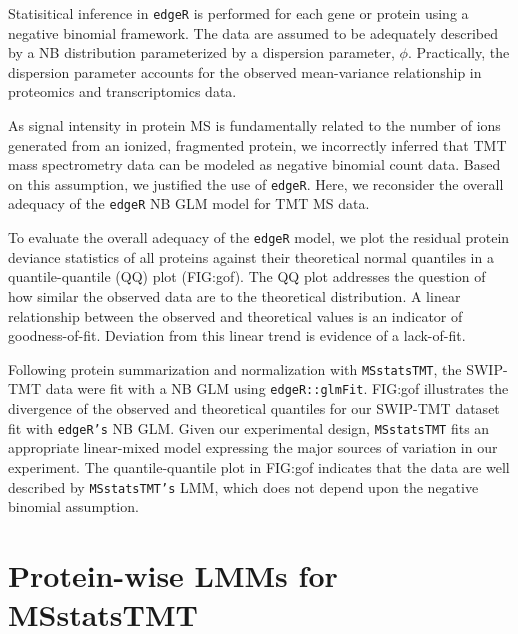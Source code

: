 \documentclass[11pt]{elife}\usepackage[]{graphicx}\usepackage[]{color}
\begin{document}
Statisitical inference in \texttt{edgeR} is performed for each gene or protein 
using a negative binomial framework. The data are assumed to 
be adequately described by a NB distribution parameterized by a dispersion 
parameter, $\phi$. Practically, the dispersion parameter accounts for the
observed mean-variance relationship in proteomics and transcriptomics data.

As signal intensity in protein MS is fundamentally related to the number of ions generated from
an ionized, fragmented protein, we incorrectly inferred that TMT
mass spectrometry data can be modeled as negative binomial count data. Based on
this assumption, we justified the use of \texttt{edgeR}.  Here, we reconsider
the overall adequacy of the \texttt{edgeR} NB GLM model for TMT MS data.

To evaluate the overall adequacy of the \texttt{edgeR} model, we plot the
residual protein deviance statistics of all proteins against their theoretical
normal quantiles in a quantile-quantile (QQ) plot (FIG:gof).  The QQ plot
addresses the question of how similar the observed data are to the theoretical
distribution.  A linear relationship between the observed and theoretical
values is an indicator of goodness-of-fit.  Deviation from this linear trend is
evidence of a lack-of-fit.

Following protein summarization and normalization with \texttt{MSstatsTMT}, the
SWIP-TMT data were fit with a NB GLM using \texttt{edgeR::glmFit}. FIG:gof
illustrates the divergence of the observed and theoretical quantiles for our
SWIP-TMT dataset fit with \texttt{edgeR's} NB GLM. Given our experimental
design, \texttt{MSstatsTMT} fits an appropriate linear-mixed model expressing
the major sources of variation in our experiment.  The quantile-quantile plot in
FIG:gof indicates that the data are well described by \texttt{MSstatsTMT's} LMM,
which does not depend upon the negative binomial assumption.


\section{Protein-wise LMMs for MSstatsTMT}
\end{document}
